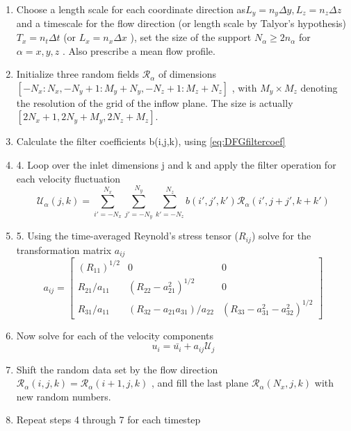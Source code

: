 \begin{enumerate}
\item Choose a length scale for each coordinate direction as$ L_{y}=n_{y}\Delta y , L_{z}=n_{z}\Delta z $ and a timescale for the flow direction (or length scale by Talyor's hypothesis) $T_{x}=n_{t}\Delta t$  (or $L_{x} = n_x \Delta x$ ), set the size of the support $N_{\alpha}\geq 2n_{\alpha} $ for $\alpha=x,y,z$ . Also prescribe a mean flow profile.
\item Initialize three random fields $\mathcal{R}_{\alpha}$  of dimensions $[-N_{x}:N_{x},-N_{y}+1:M_{y}+N_{y},-N_{z}+1:M_{z}+N_{z} ]$ , with $M_{y}\times M_{z}$  denoting the resolution of the grid of the inflow plane. The size is actually $[2N_{x}+1,2N_{y}+M_{y},2N_{z}+M_{z} ]$.
\item Calculate the filter coefficients b(i,j,k), using \ref{eq:DFGfiltercoef}
\item 4. Loop over the inlet dimensions j  and k  and apply the filter operation for each velocity fluctuation
\begin{equation} \label{eq:DFGmain}
\mathcal{U}_{\alpha}(j,k)=\sum_{i'=-N_{x}}^{N_{x}}\sum_{j'=-N_{y}}^{N_{y}}\sum_{k'=-N_{z}}^{N_{z}}b(i',j',k')\mathcal{R}_{\alpha}(i',j+j',k+k') 
\end{equation}
\item 5. Using the time-averaged Reynold's stress tensor ($R_{ij}$)  solve for the transformation matrix $a_{ij}$
\begin{equation}
 a_{ij}=\left[\begin{array}{ccc}
(R_{11})^{1/2} & 0 & 0\\
R_{21}/a_{11} & (R_{22}-a_{21}^{2})^{1/2} & 0\\
R_{31}/a_{11} & (R_{32}-a_{21}a_{31})/a_{22} & (R_{33}-a_{31}^{2}-a_{32}^{2})^{1/2}
\end{array}\right] 
\end{equation}
\item  Now solve for each of the velocity components
\begin{equation}
u_{i}=\bar{u_{i}}+a_{ij}\mathcal{U}_{j} 
\end{equation}
\item Shift the random data set by the flow direction $\mathcal{R}_{\alpha}(i,j,k)=\mathcal{R}_{\alpha}(i+1,j,k)$ , and fill the last plane $\mathcal{R}_{\alpha}(N_{x},j,k)$  with new random numbers.
\item Repeat steps 4 through 7 for each timestep
\end{enumerate}

